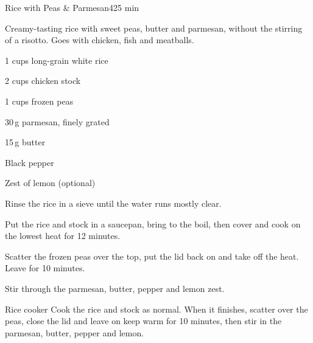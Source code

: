 \begin{recipebox}{Rice with Peas \& Parmesan}{4}{25 min}

Creamy-tasting rice with sweet peas, butter and parmesan, without the
stirring of a risotto. Goes with chicken, fish and meatballs.

\begin{ingredients}
  \item 1 cups long-grain white rice
  \item 2 cups chicken stock
  \item 1 cups frozen peas
  \item 30\,g parmesan, finely grated
  \item 15\,g butter
  \item Black pepper
  \item Zest of  lemon (optional)
\end{ingredients}

\begin{method}
  \item Rinse the rice in a sieve until the water runs mostly clear.
  \item Put the rice and stock in a saucepan, bring to the boil, then cover and cook on the lowest heat for 12 minutes.
  \item Scatter the frozen peas over the top, put the lid back on and take off the heat. Leave for 10 minutes.
  \item Stir through the parmesan, butter, pepper and lemon zest.
\end{method}

\begin{variationbox}{Rice cooker}
Cook the rice and stock as normal. When it finishes, scatter over the peas, close the lid and leave on keep warm for 10 minutes, then stir in the parmesan, butter, pepper and lemon.
\end{variationbox}

\end{recipebox}
